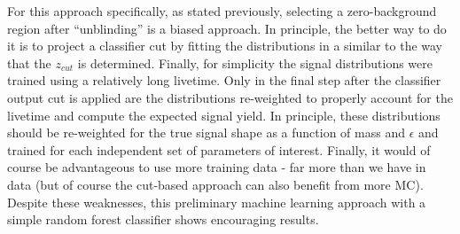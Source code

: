 For this approach specifically, as stated previously, selecting a zero-background region after ``unblinding'' is a biased approach. In principle, the better way to do it is to project a classifier cut by fitting the distributions in a similar to the way that the $z_{cut}$ is determined. Finally, for simplicity the signal distributions were trained using a relatively long livetime. Only in the final step after the classifier output cut is applied are the distributions re-weighted to properly account for the livetime and compute the expected signal yield. In principle, these distributions should be re-weighted for the true signal shape as a function of mass and $\epsilon$ and trained for each independent set of parameters of interest. Finally, it would of course be advantageous to use more training data - far more than we have in data (but of course the cut-based approach can also benefit from more MC). Despite these weaknesses, this preliminary machine learning approach with a simple random forest classifier shows encouraging results.